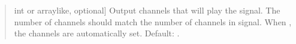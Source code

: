 \documentclass[letterpaper,10pt,english]{sphinxmanual}
\begin{document}
\begin{fulllineitems}
\begin{quote}
\begin{description}
\begin{description}
\sphinxlineitem{\sphinxstylestrong{play\_channels}}{[}int or array\sphinxhyphen{}like, optional{]}
\sphinxAtStartPar
Output channels that will play the signal. The number of channels
should match the number of channels in signal. When , the
channels are automatically set. Default: .

\end{description}

\end{description}\end{quote}

\end{fulllineitems}

\end{document}
